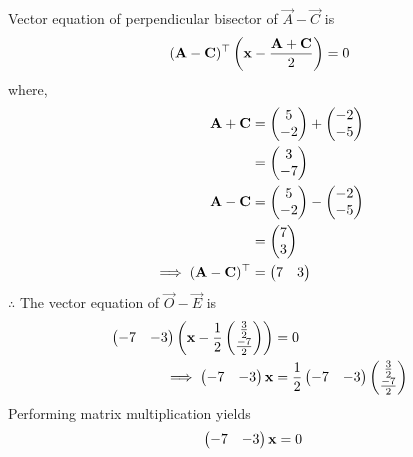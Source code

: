 \documentclass[11pt]{book}
\begin{document}
\begin{enumerate}[label=\thesection.\arabic*.,ref=\thesection.\theenumi]
Vector equation of perpendicular bisector of $\vec{A}-\vec{C}$ is
\begin{align}
(\mathbf{A}-\mathbf{C})^\top\left( \mathbf{x} - \frac{\mathbf{A}+\mathbf{C}}{2}\right) = 0
\end{align}
where,
\begin{align}
\mathbf{A}+\mathbf{C}&=\begin{pmatrix}5\\-2\end{pmatrix}+\begin{pmatrix}-2\\-5\end{pmatrix}\\
&=\begin{pmatrix}3\\-7\end{pmatrix}\\
\mathbf{A}-\mathbf{C} &= \begin{pmatrix}5\\-2\end{pmatrix}-\begin{pmatrix}-2\\-5\end{pmatrix}\\
&=\begin{pmatrix}7\\3\end{pmatrix}\\
\implies (\mathbf{A}-\mathbf{C})^\top &= \begin{pmatrix}7&3\end{pmatrix}
\end{align}
$\therefore $ The vector equation of $\vec{O}-\vec{E}$ is
\begin{align}
\begin{pmatrix}-7&-3\end{pmatrix}\left( \mathbf{x}-\frac{1}{2}\begin{pmatrix}\frac{3}{2}\\ \frac{-7}{2}\end{pmatrix}\right)&=0\\
\implies \begin{pmatrix}-7&-3\end{pmatrix}\mathbf{x}&=\frac{1}{2}\begin{pmatrix}-7&-3\end{pmatrix}\begin{pmatrix}\frac{3}{2}\\ \frac{-7}{2}\end{pmatrix}
\end{align}
Performing matrix multiplication yields
\begin{align}
\begin{pmatrix}-7&-3\end{pmatrix}\mathbf{x}&=0
\end{align}


\end{enumerate}
\end{document}
